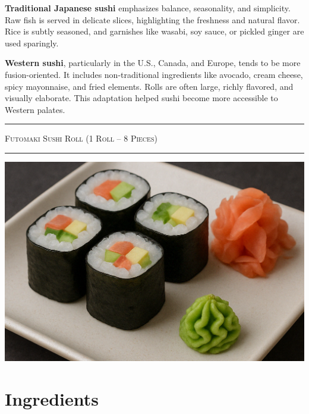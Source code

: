 \documentclass[landscape, a4paper]{article}
\newcommand\alert[1]{\textcolor{PrimaryColor}{\textbf{#1}}}
\begin{document}
\begin{minipage}[t]{0.31\textwidth}
	\alert{Traditional Japanese sushi} emphasizes balance, seasonality, and simplicity. Raw fish is served in delicate slices, highlighting the freshness and natural flavor. Rice is subtly seasoned, and garnishes like wasabi, soy sauce, or pickled ginger are used sparingly.

	\alert{Western sushi}, particularly in the U.S., Canada, and Europe, tends to be more fusion-oriented. It includes non-traditional ingredients like avocado, cream cheese, spicy mayonnaise, and fried elements. Rolls are often large, richly flavored, and visually elaborate. This adaptation helped sushi become more accessible to Western palates.

\end{minipage}%

\newpage

\begin{minipage}[t]{0.31\textwidth}
	\setlength{\parskip}{0.25cm}
	\vspace{0.5cm}

	\textcolor{PrimaryColor}{
		\rule{\linewidth}{0.5mm}
		\vspace{-0.1cm}
		\begin{center}
			\large
			\textsc{Futomaki Sushi Roll (1 Roll – 8 Pieces)}
		\end{center}
		\rule{\linewidth}{0.5mm}
	}

	\includegraphics[width=\linewidth]{./figures/futomaki_sushi.png}

	\section*{Ingredients}


\end{minipage}
\end{document}
